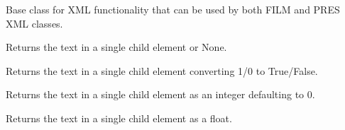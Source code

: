 \documentclass[letterpaper,10pt,english]{sphinxmanual}
\begin{document}

\begin{fulllineitems}
\label{\detokenize{ref/util/plot/XMLCfg:TotalDepth.util.plot.XMLCfg.LgXMLBase}}
Base class for XML functionality that can be used by both FILM and PRES XML classes.

\begin{fulllineitems}
\label{\detokenize{ref/util/plot/XMLCfg:TotalDepth.util.plot.XMLCfg.LgXMLBase.str}}
Returns the text in a single child element or None.

\end{fulllineitems}


\begin{fulllineitems}
\label{\detokenize{ref/util/plot/XMLCfg:TotalDepth.util.plot.XMLCfg.LgXMLBase.bool}}
Returns the text in a single child element converting 1/0 to True/False.

\end{fulllineitems}


\begin{fulllineitems}
\label{\detokenize{ref/util/plot/XMLCfg:TotalDepth.util.plot.XMLCfg.LgXMLBase.int}}
Returns the text in a single child element as an integer defaulting to 0.

\end{fulllineitems}


\begin{fulllineitems}
\label{\detokenize{ref/util/plot/XMLCfg:TotalDepth.util.plot.XMLCfg.LgXMLBase.float}}
Returns the text in a single child element as a float.

\end{fulllineitems}


\end{fulllineitems}
\end{document}
